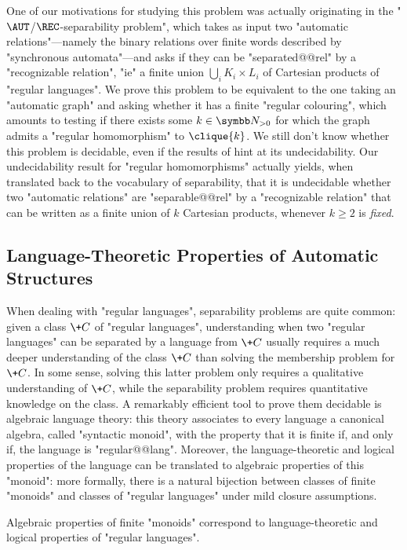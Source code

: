 One of our motivations for studying this problem was actually originating
in the "$\AUT$/$\REC$-separability problem", which takes as input two "automatic relations"---namely the binary relations over finite words described by "synchronous automata"---and asks if they can be
"separated@@rel" by a "recognizable relation", "ie" a finite union $\bigcup_i K_i \times L_i$
of Cartesian products of "regular languages". 
We prove this problem to be equivalent to the one taking an "automatic graph" and asking
whether it has a finite "regular colouring", which amounts to testing
if there exists some $k\in\Np$ for which the graph admits a "regular homomorphism" to
$\clique{k}$. We still don't know whether this problem is decidable, 
even if the results of  hint at its undecidability.
Our undecidability result for "regular homomorphisms"
actually yields, when translated back to the vocabulary of separability,
that it is undecidable whether two "automatic relations" are "separable@@rel"
by a "recognizable relation" that can be written as
a finite union of $k$ Cartesian products, whenever $k \geq 2$ is \emph{fixed}.

\subsection{Language-Theoretic Properties of Automatic Structures}

When dealing with "regular languages",
separability problems are quite common:
given a class $\+C$ of "regular languages", understanding
when two "regular languages" can be separated by a language from $\+C$
usually requires a much deeper understanding of the class $\+C$ than
solving the membership problem for $\+C$. In some sense, solving
this latter problem only requires a qualitative understanding of $\+C$,
while the separability problem requires quantitative knowledge on the class. 
A remarkably efficient tool
to prove them decidable is algebraic language theory:
this theory associates to every language a canonical algebra, called "syntactic monoid",
with the property that it is finite if, and only if, the language is "regular@@lang".
Moreover, the language-theoretic and logical properties of the language can be
translated to algebraic properties of this "monoid": more formally, there is a natural
bijection between classes of finite "monoids" and classes of
"regular languages" under mild closure assumptions.

\begin{known}
	Algebraic properties of finite "monoids" correspond to
	language-theoretic and logical properties of "regular languages".
\end{known}

